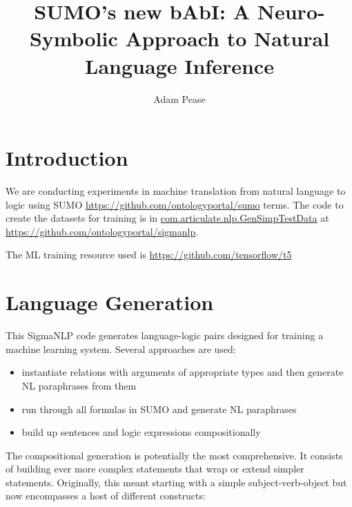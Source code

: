 \documentclass[letterpaper]{article}
\title{SUMO's new bAbI: A Neuro-Symbolic Approach to Natural Language Inference}
\date{\vspace{-5ex}}
\author{Adam Pease}
\begin{document}
\maketitle

\section{Introduction}

\begin{sloppypar}
We are conducting experiments in machine translation from natural language to logic using SUMO \url{https://github.com/ontologyportal/sumo} terms.
The code to create the datasets for training is in \url{com.articulate.nlp.GenSimpTestData} at 
\url{https://github.com/ontologyportal/sigmanlp}.
\end{sloppypar}

The ML training resource used is \url{https://github.com/tensorflow/t5}

\section{Language Generation}

This SigmaNLP code generates language-logic pairs designed for training a machine learning system. Several approaches are used:

\begin{itemize}
\item instantiate relations with arguments of appropriate types and then generate NL paraphrases from them
\item run through all formulas in SUMO and generate NL paraphrases
\item build up sentences and logic expressions compositionally
\end{itemize}


The compositional generation is potentially the most comprehensive. It consists of building ever more complex statements that wrap or extend simpler statements. Originally, this meant starting with a simple subject-verb-object but now encompasses a host of different constructs:
\end{document}
